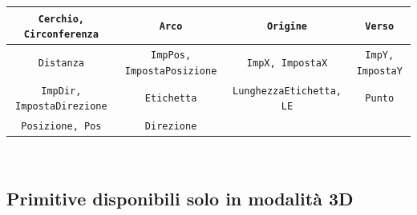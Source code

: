\begin{center}
	\begin{tabular}{|cccc|}
		\hline
		\texttt{Cerchio, Circonferenza}&
		\texttt{Arco}&
		\texttt{Origine}&
		\texttt{Verso}\\
		\hline
		\texttt{Distanza}&
		\texttt{ImpPos, ImpostaPosizione}&
		\texttt{ImpX, ImpostaX}&
		\texttt{ImpY, ImpostaY}\\
		\hline
		\texttt{ImpDir, ImpostaDirezione}&
		\texttt{Etichetta}&
		\texttt{LunghezzaEtichetta, LE}&
		\texttt{Punto}\\
		\hline
		\texttt{Posizione, Pos}&
		\texttt{Direzione} & &\\
		\hline
	\end{tabular} \\ \vspace{0.5cm}
\end{center}

\subsection{Primitive disponibili solo in modalità 3D}

